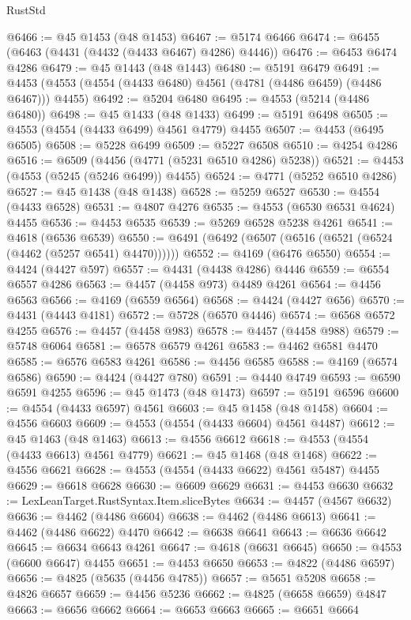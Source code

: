 \begin{lexlean}{RustStd}
\begin{coremodule}
@6466 := @45 @1453 (@48 @1453)
@6467 := @5174 @6466
@6474 := @6455 (@6463 (@4431 (@4432 (@4433 @6467) @4286) @4446))
@6476 := @6453 @6474 @4286
@6479 := @45 @1443 (@48 @1443)
@6480 := @5191 @6479
@6491 := @4453 (@4553 (@4554 (@4433 @6480) @4561 (@4781 (@4486 @6459) (@4486 @6467))) @4455)
@6492 := @5204 @6480
@6495 := @4553 (@5214 (@4486 @6480))
@6498 := @45 @1433 (@48 @1433)
@6499 := @5191 @6498
@6505 := @4553 (@4554 (@4433 @6499) @4561 @4779) @4455
@6507 := @4453 (@6495 @6505)
@6508 := @5228 @6499
@6509 := @5227 @6508
@6510 := @4254 @4286
@6516 := @6509 (@4456 (@4771 (@5231 @6510 @4286) @5238))
@6521 := @4453 (@4553 (@5245 (@5246 @6499)) @4455)
@6524 := @4771 (@5252 @6510 @4286)
@6527 := @45 @1438 (@48 @1438)
@6528 := @5259 @6527
@6530 := @4554 (@4433 @6528)
@6531 := @4807 @4276
@6535 := @4553 (@6530 @6531 @4624) @4455
@6536 := @4453 @6535
@6539 := @5269 @6528 @5238 @4261
@6541 := @4618 (@6536 @6539)
@6550 := @6491 (@6492 (@6507 (@6516 (@6521 (@6524 (@4462 (@5257 @6541) @4470))))))
@6552 := @4169 (@6476 @6550)
@6554 := @4424 (@4427 @597)
@6557 := @4431 (@4438 @4286) @4446
@6559 := @6554 @6557 @4286
@6563 := @4457 (@4458 @973) @4489 @4261
@6564 := @4456 @6563
@6566 := @4169 (@6559 @6564)
@6568 := @4424 (@4427 @656)
@6570 := @4431 (@4443 @4181)
@6572 := @5728 (@6570 @4446)
@6574 := @6568 @6572 @4255
@6576 := @4457 (@4458 @983)
@6578 := @4457 (@4458 @988)
@6579 := @5748 @6064
@6581 := @6578 @6579 @4261
@6583 := @4462 @6581 @4470
@6585 := @6576 @6583 @4261
@6586 := @4456 @6585
@6588 := @4169 (@6574 @6586)
@6590 := @4424 (@4427 @780)
@6591 := @4440 @4749
@6593 := @6590 @6591 @4255
@6596 := @45 @1473 (@48 @1473)
@6597 := @5191 @6596
@6600 := @4554 (@4433 @6597) @4561
@6603 := @45 @1458 (@48 @1458)
@6604 := @4556 @6603
@6609 := @4553 (@4554 (@4433 @6604) @4561 @4487)
@6612 := @45 @1463 (@48 @1463)
@6613 := @4556 @6612
@6618 := @4553 (@4554 (@4433 @6613) @4561 @4779)
@6621 := @45 @1468 (@48 @1468)
@6622 := @4556 @6621
@6628 := @4553 (@4554 (@4433 @6622) @4561 @5487) @4455
@6629 := @6618 @6628
@6630 := @6609 @6629
@6631 := @4453 @6630
@6632 := LexLeanTarget.RustSyntax.Item.sliceBytes
@6634 := @4457 (@4567 @6632)
@6636 := @4462 (@4486 @6604)
@6638 := @4462 (@4486 @6613)
@6641 := @4462 (@4486 @6622) @4470
@6642 := @6638 @6641
@6643 := @6636 @6642
@6645 := @6634 @6643 @4261
@6647 := @4618 (@6631 @6645)
@6650 := @4553 (@6600 @6647) @4455
@6651 := @4453 @6650
@6653 := @4822 (@4486 @6597)
@6656 := @4825 (@5635 (@4456 @4785))
@6657 := @5651 @5208
@6658 := @4826 @6657
@6659 := @4456 @5236
@6662 := @4825 (@6658 @6659) @4847
@6663 := @6656 @6662
@6664 := @6653 @6663
@6665 := @6651 @6664

\end{coremodule}
\end{lexlean}
